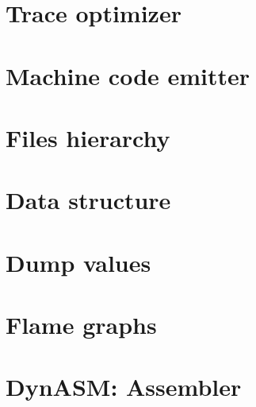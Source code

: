 \documentclass[12pt, oneside]{Thesis}
\begin{document}
  \chapter{Trace optimizer}
  \label{Chapt:TO}
  

  \chapter{Machine code emitter}
  \label{Chapt:mcode}
\clearpage
{}
\appendix
\baselineskip=16pt

\chapter{Files hierarchy}
\label{Apendix:files}


\chapter{Data structure}
\label{Apendix:ds}

\chapter{Dump values}
\label{Apendix:dump-values}


\chapter{Flame graphs}
\label{Apendix:fl}


\chapter{DynASM: Assembler}
\label{Apendix:DynASM}



\backmatter


\label{Bibliography}

\renewcommand{\bibname}{References}


\end{document}
